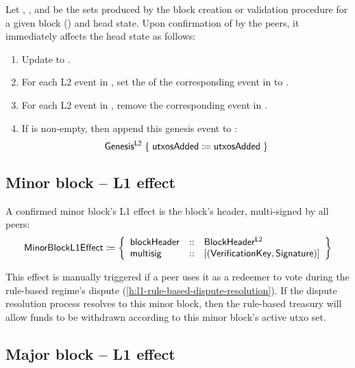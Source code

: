 \documentclass[../hydrozoa.tex]{subfiles}
\begin{document}
Let , , and  be the sets produced by the block creation or validation procedure for a given block () and head state.
Upon confirmation of  by the peers, it immediately affects the head state as follows:
\begin{enumerate}
  \item Update  to .
  \item For each L2 event in , set the  of the corresponding event in  to .
  \item For each L2 event in , remove the corresponding event in .
  \item If  is non-empty, then append this genesis event to :
    \begin{equation*}
      \mathsf{Genesis^{L2}} \;\{\; \mathsf{utxosAdded} \coloneq \mathsf{utxosAdded} \;\}
    \end{equation*}
\end{enumerate}

\subsection{Minor block -- L1 effect}%
\label{h:l2-block-effect-minor-block}%

A confirmed minor block's L1 effect is the block's header, multi-signed by all peers:
\begin{equation*}
  \mathsf{MinorBlockL1Effect} \coloneq \left\{
    \begin{array}{lll}
      \mathsf{blockHeader} &::& \mathsf{BlockHeader^{L2}} \\
      \mathsf{multisig} &::& [(\mathsf{VerificationKey}, \mathsf{Signature})]
    \end{array}\right\}
\end{equation*}

This effect is manually triggered if a peer uses it as a redeemer to vote during the rule-based regime's dispute (\cref{h:l1-rule-based-dispute-resolution}).
If the dispute resolution process resolves to this minor block, then the rule-based treasury will allow funds to be withdrawn according to this minor block's active utxo set.

\subsection{Major block -- L1 effect}%
\label{h:l2-block-effect-major-block}%
\end{document}
